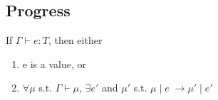 \documentclass{llncs}
\begin{document}
\subsection{Progress}
\begin{theorem}[Progress]
If $\Gamma \vdash e : T$, then either
\begin{enumerate}
\item e is a value, or
\item $\forall \mu$ s.t.
		   $\Gamma \vdash \mu$,
         $\exists e'$ and $\mu'$ s.t. 
         $\mu \; | \; e \; \rightarrow \mu' \; | \; e'$
\end{enumerate}
\end{theorem}





\end{document}
